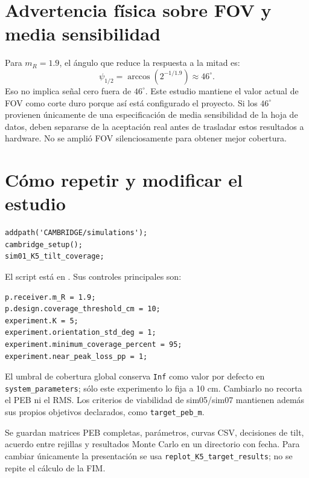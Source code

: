 \documentclass[11pt,a4paper]{article}
\begin{document}
\section{Advertencia física sobre FOV y media sensibilidad}
Para $m_R=1.9$, el ángulo que reduce la respuesta a la mitad es:
\begin{equation}
 \psi_{1/2}=\arccos(2^{-1/1.9})\approx46^\circ.
\end{equation}
Eso no implica señal cero fuera de $46^\circ$. Este estudio mantiene el valor actual de FOV como corte duro porque así está configurado el proyecto. Si los $46^\circ$ provienen únicamente de una especificación de media sensibilidad de la hoja de datos, deben separarse de la aceptación real antes de trasladar estos resultados a hardware. No se amplió FOV silenciosamente para obtener mejor cobertura.

\section{Cómo repetir y modificar el estudio}
\begin{verbatim}
addpath('CAMBRIDGE/simulations');
cambridge_setup();
sim01_K5_tilt_coverage;
\end{verbatim}
El script está en . Sus controles principales son:
\begin{verbatim}
p.receiver.m_R = 1.9;
p.design.coverage_threshold_cm = 10;
experiment.K = 5;
experiment.orientation_std_deg = 1;
experiment.minimum_coverage_percent = 95;
experiment.near_peak_loss_pp = 1;
\end{verbatim}
El umbral de cobertura global conserva \texttt{Inf} como valor por defecto en \texttt{system\_parameters}; sólo este experimento lo fija a 10 cm. Cambiarlo no recorta el PEB ni el RMS. Los criterios de viabilidad de sim05/sim07 mantienen además sus propios objetivos declarados, como \texttt{target\_peb\_m}.

Se guardan matrices PEB completas, parámetros, curvas CSV, decisiones de tilt, acuerdo entre rejillas y resultados Monte Carlo en un directorio con fecha. Para cambiar únicamente la presentación se usa \texttt{replot\_K5\_target\_results}; no se repite el cálculo de la FIM.
\end{document}

